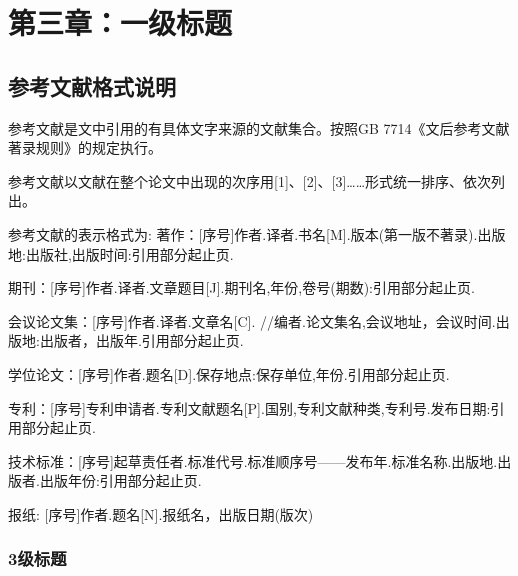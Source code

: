  \setlength{\baselineskip}{20pt}
\chapter{第三章：一级标题}
\label{cha:chap3}



\section{参考文献格式说明}

参考文献是文中引用的有具体文字来源的文献集合。按照GB 7714《文后参考文献著录规则》的规定执行。

参考文献以文献在整个论文中出现的次序用[1]、[2]、[3]……形式统一排序、依次列出。

参考文献的表示格式为:
著作：[序号]作者.译者.书名[M].版本(第一版不著录).出版地:出版社,出版时间:引用部分起止页.

期刊：[序号]作者.译者.文章题目[J].期刊名,年份,卷号(期数):引用部分起止页.

会议论文集：[序号]作者.译者.文章名[C]. //编者.论文集名,会议地址，会议时间.出版地:出版者，出版年.引用部分起止页.

学位论文：[序号]作者.题名[D].保存地点:保存单位,年份.引用部分起止页.

专利：[序号]专利申请者.专利文献题名[P].国别,专利文献种类,专利号.发布日期:引用部分起止页.

技术标准：[序号]起草责任者.标准代号.标准顺序号——发布年.标准名称.出版地.出版者.出版年份:引用部分起止页.

报纸: [序号]作者.题名[N].报纸名，出版日期(版次)



\subsection{3级标题}
